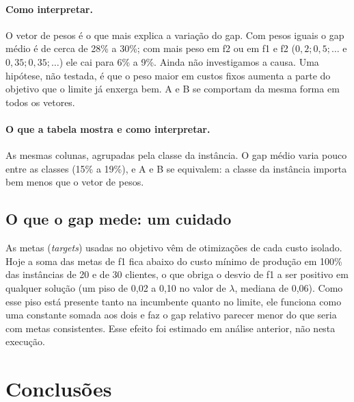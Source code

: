 \documentclass[11pt,a4paper]{article}
\begin{document}
\paragraph{Como interpretar.} O vetor de pesos é o que mais explica a variação do gap. Com
pesos iguais o gap médio é de cerca de 28\% a 30\%; com mais peso em f2 ou em f1 e f2
($0{,}2;0{,}5;\ldots$ e $0{,}35;0{,}35;\ldots$) ele cai para 6\% a 9\%. Ainda não investigamos a
causa. Uma hipótese, não testada, é que o peso maior em custos fixos aumenta a parte do
objetivo que o limite já enxerga bem. A e B se comportam da mesma forma em todos os vetores.

\begin{table}[H]
  \centering
  \scriptsize
  \resizebox{\textwidth}{!}{}
  \caption{Gap por classe de instância, nas tarefas analisadas.}
  \label{tab:gap-classe}
\end{table}

\paragraph{O que a tabela mostra e como interpretar.} As mesmas colunas, agrupadas pela
classe da instância. O gap médio varia pouco entre as classes (15\% a 19\%), e A e B se
equivalem: a classe da instância importa bem menos que o vetor de pesos.

\subsection{O que o gap mede: um cuidado}

As metas (\emph{targets}) usadas no objetivo vêm de otimizações de cada custo
isolado. Hoje a soma das metas de f1 fica abaixo do custo mínimo de produção em
100\% das instâncias de 20 e de 30 clientes, o que obriga o desvio de f1 a ser positivo em
qualquer solução (um piso de 0,02 a 0,10 no valor de $\lambda$, mediana de 0,06). Como esse piso
está presente tanto na incumbente quanto no limite, ele funciona como uma constante somada
aos dois e faz o gap relativo parecer menor do que seria com metas consistentes. Esse
efeito foi estimado em análise anterior, não nesta execução.

\section{Conclusões}
\end{document}
